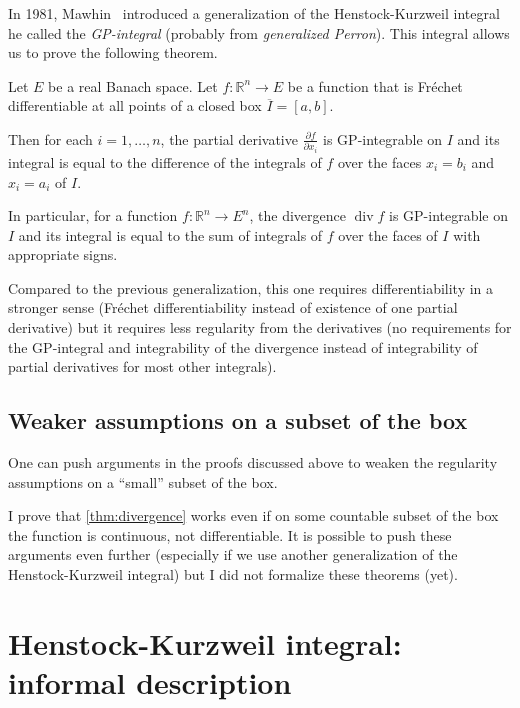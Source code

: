 \documentclass[a4paper, UKenglish,cleveref, autoref, thm-restate]{lipics-v2021}
\newcommand{\bbR}{\mathbb{R}}
\DeclareMathOperator{\divg}{div}
\begin{document}
In 1981, Mawhin~\cite{Mawhin81} introduced a generalization of the
Henstock-Kurzweil integral he called the \emph{GP-integral} (probably
from \emph{generalized Perron}). This integral allows us to prove the
following theorem.

\begin{theorem}%
  [see~\cite{Mawhin81}]%
  \label{thm:divergence}
  Let \(E\) be a real Banach space. Let \(f\colon \bbR^{n}\to E\) be a
  function that is Fréchet differentiable at all points of a closed
  box \(\overline I=[a, b]\).

  Then for each \(i=1,\dots,n\), the partial derivative
  \(\frac{\partial f}{\partial x_{i}}\) is GP-integrable on \(I\) and
  its integral is equal to the difference of the integrals of \(f\) over
  the faces \(x_{i}=b_{i}\) and \(x_{i}=a_{i}\) of \(I\).

  In particular, for a function \(f\colon \bbR^{n}\to E^{n}\), the
  divergence \(\divg f\) is GP-integrable on \(I\) and its integral is
  equal to the sum of integrals of \(f\) over the faces of \(I\) with
  appropriate signs.
\end{theorem}

Compared to the previous generalization, this one requires
differentiability in a stronger sense (Fréchet differentiability
instead of existence of one partial derivative) but it requires less
regularity from the derivatives (no requirements for the GP-integral
and integrability of the divergence instead of integrability of
partial derivatives for most other integrals).

\subsection{Weaker assumptions on a subset of the box}

One can push arguments in the proofs discussed above to weaken the
regularity assumptions on a “small” subset of the box.

I prove that \autoref{thm:divergence} works even if on some countable
subset of the box the function is continuous, not differentiable. It
is possible to push these arguments even further (especially if we use
another generalization of the Henstock-Kurzweil integral) but I did
not formalize these theorems (yet).

\section{Henstock-Kurzweil integral: informal description}\label{sec:henst-kurzw-informal}
\end{document}
